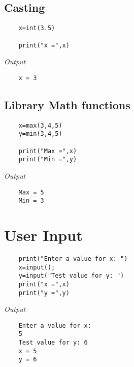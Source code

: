 \documentclass{report}
\begin{document}
	\subsection{Casting}
	\vspace{-15pt}
	\begin{verbatim}
	x=int(3.5)
	
	print("x =",x)
	\end{verbatim}
	\vspace{-10pt}
	
	\textit{Output}
	\vspace{-15pt}
	\begin{verbatim}
	x = 3
	\end{verbatim}
	\vspace{-10pt}

	\subsection{Library Math functions}
	\vspace{-15pt}
	\begin{verbatim}
	x=max(3,4,5)
	y=min(3,4,5)
	
	print("Max =",x)
	print("Min =",y)
	\end{verbatim}
	\vspace{-10pt}
	
	\textit{Output}
	\vspace{-15pt}
	\begin{verbatim}
	Max = 5
	Min = 3
	\end{verbatim}
	\vspace{-10pt}
	
	\section{User Input}
	\vspace{-15pt}
	\begin{verbatim}
	print("Enter a value for x: ")
	x=input();
	y=input("Test value for y: ")
	print("x =",x)
	print("y =",y)
	\end{verbatim}
	\vspace{-10pt}
	
	\textit{Output}
	\vspace{-15pt}
	\begin{verbatim}
	Enter a value for x: 
	5
	Test value for y: 6
	x = 5
	y = 6
	\end{verbatim}
	\vspace{-10pt}
	
\end{document}
